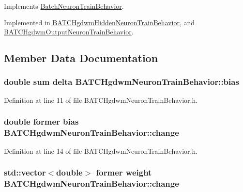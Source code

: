 Implements \hyperlink{class_batch_neuron_train_behavior_a8cac2df1e1e2bac29ddc8567676dd74d}{BatchNeuronTrainBehavior}.



Implemented in \hyperlink{class_b_a_t_c_hgdwm_hidden_neuron_train_behavior_a0119438b8f44461cde1e4d29319c1858}{BATCHgdwmHiddenNeuronTrainBehavior}, and \hyperlink{class_b_a_t_c_hgdwm_output_neuron_train_behavior_adc9f09a17e77554f6094df04394d7bff}{BATCHgdwmOutputNeuronTrainBehavior}.



\subsection{Member Data Documentation}
\hypertarget{class_b_a_t_c_hgdwm_neuron_train_behavior_a431837463ccd5c03227dd9ea0f077e31}{
\subsubsection[{bias}]{\setlength{\rightskip}{0pt plus 5cm}double sum {\bf delta} {\bf BATCHgdwmNeuronTrainBehavior::bias}}}
\label{class_b_a_t_c_hgdwm_neuron_train_behavior_a431837463ccd5c03227dd9ea0f077e31}


Definition at line 11 of file BATCHgdwmNeuronTrainBehavior.h.

\hypertarget{class_b_a_t_c_hgdwm_neuron_train_behavior_a29ffa5e56fdd2a551cb200c549960db4}{
\subsubsection[{change}]{\setlength{\rightskip}{0pt plus 5cm}double former {\bf bias} {\bf BATCHgdwmNeuronTrainBehavior::change}}}
\label{class_b_a_t_c_hgdwm_neuron_train_behavior_a29ffa5e56fdd2a551cb200c549960db4}


Definition at line 14 of file BATCHgdwmNeuronTrainBehavior.h.

\hypertarget{class_b_a_t_c_hgdwm_neuron_train_behavior_ae74125bcb50340b4c75e3716ca409978}{
\subsubsection[{change}]{\setlength{\rightskip}{0pt plus 5cm}std::vector$<$double$>$ former weight {\bf BATCHgdwmNeuronTrainBehavior::change}}}
\label{class_b_a_t_c_hgdwm_neuron_train_behavior_ae74125bcb50340b4c75e3716ca409978}


